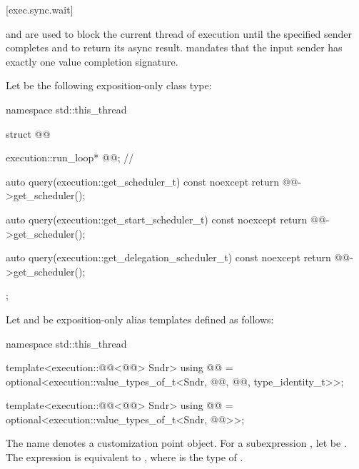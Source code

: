 [exec.sync.wait]{}

\pnum
{} and 
are used
to block the current thread of execution
until the specified sender completes and
to return its async result.
 mandates
that the input sender has exactly one value completion signature.

\pnum
Let  be the following exposition-only class type:
\begin{codeblock}
namespace std::this_thread {
  struct @@ {
    execution::run_loop* @@;                                  // \expos

    auto query(execution::get_scheduler_t) const noexcept {
      return @@->get_scheduler();
    }

    auto query(execution::get_start_scheduler_t) const noexcept {
      return @@->get_scheduler();
    }

    auto query(execution::get_delegation_scheduler_t) const noexcept {
      return @@->get_scheduler();
    }
  };
}
\end{codeblock}

\pnum
Let  and
be exposition-only alias templates defined as follows:
\begin{codeblock}
namespace std::this_thread {
  template<execution::@@<@@> Sndr>
    using @@ =
      optional<execution::value_types_of_t<Sndr, @@, @@,
               type_identity_t>>;

  template<execution::@@<@@> Sndr>
    using @@ =
      optional<execution::value_types_of_t<Sndr, @@>>;
}
\end{codeblock}

\pnum
The name  denotes a customization point object.
For a subexpression , let  be .
The expression 
is equivalent to ,
where  is the type of
.


